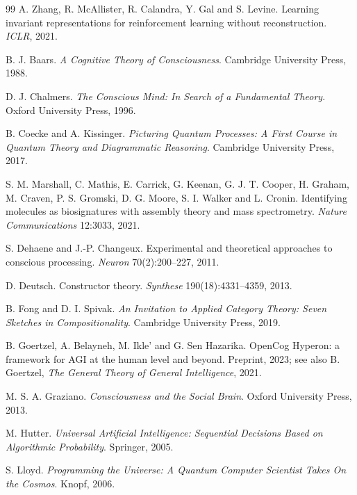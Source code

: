 \begin{thebibliography}{99}
 A. Zhang, R. McAllister, R. Calandra, Y. Gal and S. Levine. Learning
invariant representations for reinforcement learning without reconstruction. \emph{ICLR},
2021.


 B. J. Baars. \emph{A Cognitive Theory of Consciousness}. Cambridge
University Press, 1988.

 D. J. Chalmers. \emph{The Conscious Mind: In Search of a
Fundamental Theory}. Oxford University Press, 1996.

 B. Coecke and A. Kissinger. \emph{Picturing Quantum
Processes: A First Course in Quantum Theory and Diagrammatic Reasoning}. Cambridge
University Press, 2017.

 S. M. Marshall, C. Mathis, E. Carrick, G. Keenan, G. J. T. Cooper,
H. Graham, M. Craven, P. S. Gromski, D. G. Moore, S. I. Walker and L. Cronin.
Identifying molecules as biosignatures with assembly theory and mass spectrometry.
\emph{Nature Communications} 12:3033, 2021.

 S. Dehaene and J.-P. Changeux. Experimental and theoretical
approaches to conscious processing. \emph{Neuron} 70(2):200--227, 2011.

 D. Deutsch. Constructor theory. \emph{Synthese}
190(18):4331--4359, 2013.

 B. Fong and D. I. Spivak. \emph{An Invitation to Applied
Category Theory: Seven Sketches in Compositionality}. Cambridge University Press, 2019.

 B. Goertzel, A. Belayneh, M. Ikle' and G. Sen Hazarika. OpenCog
Hyperon: a framework for AGI at the human level and beyond. Preprint, 2023; see also
B. Goertzel, \emph{The General Theory of General Intelligence}, 2021.

 M. S. A. Graziano. \emph{Consciousness and the Social Brain}.
Oxford University Press, 2013.

 M. Hutter. \emph{Universal Artificial Intelligence: Sequential
Decisions Based on Algorithmic Probability}. Springer, 2005.

 S. Lloyd. \emph{Programming the Universe: A Quantum Computer
Scientist Takes On the Cosmos}. Knopf, 2006.


\end{thebibliography}
